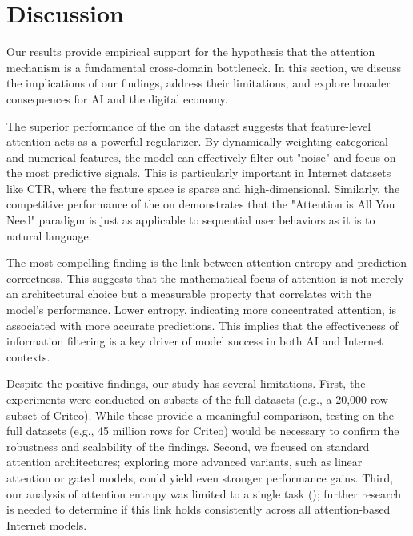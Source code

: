 \section{Discussion}
\label{sec:discussion}

Our results provide empirical support for the hypothesis that the attention mechanism is a fundamental cross-domain bottleneck. In this section, we discuss the implications of our findings, address their limitations, and explore broader consequences for AI and the digital economy.

The superior performance of the \attentionmlp on the \criteo dataset suggests that feature-level attention acts as a powerful regularizer. By dynamically weighting categorical and numerical features, the model can effectively filter out "noise" and focus on the most predictive signals. This is particularly important in Internet datasets like CTR, where the feature space is sparse and high-dimensional. Similarly, the competitive performance of the \transformer on \movielens demonstrates that the "Attention is All You Need" paradigm \cite{vaswani2017attention} is just as applicable to sequential user behaviors as it is to natural language.

The most compelling finding is the link between attention entropy and prediction correctness. This suggests that the mathematical focus of attention is not merely an architectural choice but a measurable property that correlates with the model's performance. Lower entropy, indicating more concentrated attention, is associated with more accurate predictions. This implies that the effectiveness of information filtering is a key driver of model success in both AI and Internet contexts.

Despite the positive findings, our study has several limitations. First, the experiments were conducted on subsets of the full datasets (e.g., a 20,000-row subset of Criteo). While these provide a meaningful comparison, testing on the full datasets (e.g., 45 million rows for Criteo) would be necessary to confirm the robustness and scalability of the findings. Second, we focused on standard attention architectures; exploring more advanced variants, such as linear attention \cite{hu2025gated} or gated models, could yield even stronger performance gains. Third, our analysis of attention entropy was limited to a single task (\sectask); further research is needed to determine if this link holds consistently across all attention-based Internet models.

